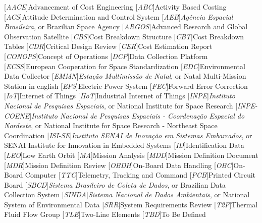 \begin{acronym}[XXXXXXXX]
    [\textit{AACE}]{Advancement of Cost Engineering}
    [\textit{ABC}]{Activity Based Costing}
    [\textit{ACS}]{Attitude Determination and Control System}
    [\textit{AEB}]{\textit{Agência Espacial Brasileira}, or Brazilian Space Agency}
    [\textit{ARGOS}]{Advanced Research and Global Observation Satellite}
    [\textit{CBS}]{Cost Breakdown Structure}
    [\textit{CBT}]{Cost Breakdown Tables}
    [\textit{CDR}]{Critical Design Review}
    [\textit{CER}]{Cost Estimation Report}
    [\textit{CONOPS}]{Concept of Operations}
    [\textit{DCP}]{Data Collection Platform}
    [\textit{ECSS}]{European Cooperation for Space Standardization}
    [\textit{EDC}]{Environmental Data Collector}
    [\textit{EMMN}]{\textit{Estação Multimissão de Natal}, or Natal Multi-Mission Station in english}
    [\textit{EPS}]{Electric Power System}
    [\textit{FEC}]{Forward Error Correction}
    [\textit{IoT}]{Internet of Things}
    [\textit{IIoT}]{Industrial Internet of Things}
    [\textit{INPE}]{\textit{Instituto Nacional de Pesquisas Espaciais}, or National Institute for Space Research}
    [\textit{INPE-COENE}]{\textit{Instituto Nacional de Pesquisas Espaciais - Coordenação Espacial do Nordeste}, or National Institute for Space Research - Northeast Space Coordination}
    [\textit{ISI-SE}]{\textit{Instituto SENAI de Inovação em Sistemas Embarcados}, or SENAI Institute for Innovation in Embedded Systems}
    [\textit{ID}]{Identification Data}
    [\textit{LEO}]{Low Earth Orbit}
    [\textit{MA}]{Mission Analysis}
    [\textit{MDD}]{Mission Definition Document}
    [\textit{MDR}]{Mission Definition Review}
    [\textit{OBDH}]{On-Board Data Handling}
    [\textit{OBC}]{On-Board Computer}
    [\textit{TTC}]{Telemetry, Tracking and Command}
    [\textit{PCB}]{Printed Circuit Board}
    [\textit{SBCD}]{\textit{Sistema Brasileiro de Coleta de Dados}, or Brazilian Data Collection System}
    [\textit{SINDA}]{\textit{Sistema Nacional de Dados Ambientais}, or National System of Environmental Data}
    [\textit{SRR}]{System Requirements Review}
    [\textit{T2F}]{Thermal Fluid Flow Group}
    [\textit{TLE}]{Two-Line Elements}
    [\textit{TBD}]{To Be Defined}

\end{acronym}
